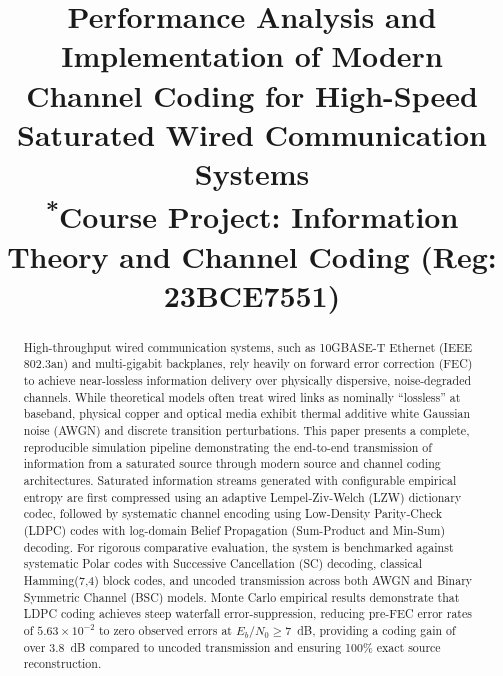 \documentclass[conference]{IEEEtran}
\begin{document}
\title{Performance Analysis and Implementation of Modern Channel Coding for High-Speed Saturated Wired Communication Systems\\
{\footnotesize \textsuperscript{*}Course Project: Information Theory and Channel Coding (Reg: 23BCE7551)}
}

\author{
}

\maketitle

\begin{abstract}
High-throughput wired communication systems, such as 10GBASE-T Ethernet (IEEE 802.3an) and multi-gigabit backplanes, rely heavily on forward error correction (FEC) to achieve near-lossless information delivery over physically dispersive, noise-degraded channels. While theoretical models often treat wired links as nominally ``lossless'' at baseband, physical copper and optical media exhibit thermal additive white Gaussian noise (AWGN) and discrete transition perturbations. This paper presents a complete, reproducible simulation pipeline demonstrating the end-to-end transmission of information from a saturated source through modern source and channel coding architectures. Saturated information streams generated with configurable empirical entropy are first compressed using an adaptive Lempel-Ziv-Welch (LZW) dictionary codec, followed by systematic channel encoding using Low-Density Parity-Check (LDPC) codes with log-domain Belief Propagation (Sum-Product and Min-Sum) decoding. For rigorous comparative evaluation, the system is benchmarked against systematic Polar codes with Successive Cancellation (SC) decoding, classical Hamming(7,4) block codes, and uncoded transmission across both AWGN and Binary Symmetric Channel (BSC) models. Monte Carlo empirical results demonstrate that LDPC coding achieves steep waterfall error-suppression, reducing pre-FEC error rates of $5.63 \times 10^{-2}$ to zero observed errors at $E_b/N_0 \ge 7$~dB, providing a coding gain of over 3.8~dB compared to uncoded transmission and ensuring 100\% exact source reconstruction.
\end{abstract}
\end{document}
